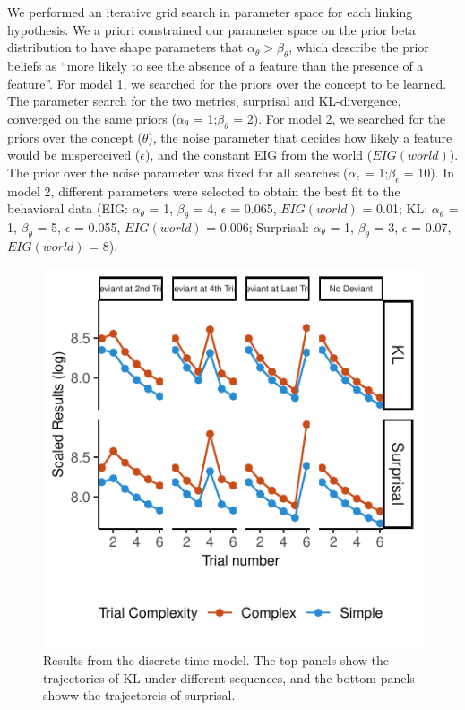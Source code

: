 \documentclass[10pt, letterpaper]{article}
\newenvironment{CodeChunk}{}{}
\begin{document}
We performed an iterative grid search in parameter space for each
linking hypothesis. We a priori constrained our parameter space on the
prior beta distribution to have shape parameters that
\(\alpha_{\theta} > \beta_{\theta}\), which describe the prior beliefs
as ``more likely to see the absence of a feature than the presence of a
feature''. For model 1, we searched for the priors over the concept to
be learned. The parameter search for the two metrics, surprisal and
KL-divergence, converged on the same priors (\(\alpha_{\theta}\) =
1;\(\beta_{\theta}\) = 2). For model 2, we searched for the priors over
the concept (\(\theta\)), the noise parameter that decides how likely a
feature would be misperceived (\(\epsilon\)), and the constant EIG from
the world (\(EIG(world)\)). The prior over the noise parameter was fixed
for all searches (\(\alpha_{\epsilon}\) = 1;\(\beta_{\epsilon}\) = 10).
In model 2, different parameters were selected to obtain the best fit to
the behavioral data (EIG: \(\alpha_{\theta}\) = 1, \(\beta_{\theta}\) =
4, \(\epsilon\) = 0.065, \(EIG(world)\) = 0.01; KL: \(\alpha_{\theta}\)
= 1, \(\beta_{\theta}\) = 5, \(\epsilon\) = 0.055, \(EIG(world)\) =
0.006; Surprisal: \(\alpha_{\theta}\) = 1, \(\beta_{\theta}\) = 3,
\(\epsilon\) = 0.07, \(EIG(world)\) = 8).

\begin{CodeChunk}
\begin{figure}[h]

{\centering \includegraphics{figs/basic_result-1} 

}

\caption[Results from the discrete time model]{Results from the discrete time model. The top panels show the trajectories of KL under different sequences, and the bottom panels showw the trajectoreis of surprisal.}\label{fig:basic_result}
\end{figure}
\end{CodeChunk}
\end{document}
